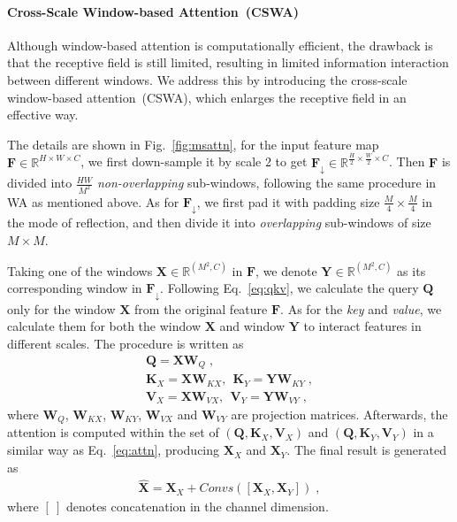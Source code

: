 \documentclass[10pt,twocolumn,letterpaper]{article}
\begin{document}
	\paragraph{Cross-Scale Window-based Attention~(CSWA)}
	Although window-based attention is computationally efficient, the drawback is that the receptive field is still limited, resulting in limited information interaction between different windows. We address this by introducing the cross-scale window-based attention~(CSWA), which enlarges the receptive field in an effective way. 
	
	The details are shown in Fig.~\ref{fig:msattn}, for the input feature map $\bm{F} \in \mathbb{R}^{H\times W\times C}$, we first down-sample it by scale 2 to get $\bm{F}_{\downarrow}\in \mathbb{R}^{\frac{H}{2}\times \frac{W}{2}\times C}$. Then $\bm{F}$ is divided into $\frac{HW}{M^2}$ \textit{non-overlapping} sub-windows, following the same procedure in WA as mentioned above. As for $\bm{F}_{\downarrow}$, we first pad it with padding size $\frac{M}{4}\times \frac{M}{4}$ in the mode of reflection, and then divide it into \textit{overlapping} sub-windows of size $M\times M$. 
	
	Taking one of the windows $\bm{X}\in \mathbb{R}^{(M^2, C)}$ in $\bm{F}$, we denote $\bm{Y}\in \mathbb{R}^{(M^2, C)}$ as its corresponding window in $\bm{F}_{\downarrow}$. Following Eq.~\eqref{eq:qkv}, we calculate the query $\bm{Q}$ only for the window $\bm{X}$ from the original feature $\bm{F}$. As for the \textit{key} and \textit{value}, we calculate them for both the window $\bm{X}$ and window $\bm{Y}$ to interact features in different scales. The procedure is written as
	\begin{align}
	\bm{Q}=\bm{X}\bm{W}_Q \;, \\
	\bm{K}_X=\bm{X}\bm{W}_{KX},~~ \bm{K}_Y=\bm{Y}\bm{W}_{KY} \;, \\
	\bm{V}_X=\bm{X}\bm{W}_{VX},~~ \bm{V}_Y=\bm{Y}\bm{W}_{VY} \;, 
	\end{align}
	where $\bm{W}_Q$, $\bm{W}_{KX}$, $\bm{W}_{KY}$, $\bm{W}_{VX}$ and $\bm{W}_{VY}$ are projection matrices. Afterwards, the attention is computed within the set of $(\bm{Q}, \bm{K}_X, \bm{V}_X)$ and $(\bm{Q}, \bm{K}_Y, \bm{V}_Y)$ in a similar way as Eq.~\eqref{eq:attn}, producing $\bm{X}_X$ and $\bm{X}_Y$. The final result is generated as
	\begin{align}
	\hat{\bm{X}}= \bm{X}_X + Convs([\bm{X}_X, \bm{X}_Y]) \;,
	\end{align}
	where $[~]$ denotes concatenation in the channel dimension.
	
\end{document}
